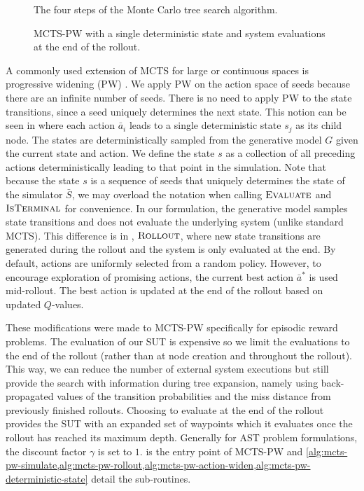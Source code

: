 \begin{figure*}[!t]
\centering
\resizebox{\textwidth}{!}{}
\caption{The four steps of the Monte Carlo tree search algorithm.}
\label{fig:mcts}
\end{figure*}

\begin{figure}[!b]
\centering
\resizebox{0.5\textwidth}{!}{}
\caption{MCTS-PW with a single deterministic state and system evaluations at the end of the rollout.}
\label{fig:mcts_pw}
\end{figure}
A commonly used extension of MCTS for large or continuous spaces is progressive widening (PW) \cite{chaslot2007progressive,mcts_ucb,ll_wildfire,mcts_wildfire}.
We apply PW on the action space of seeds because there are an infinite number of seeds.
There is no need to apply PW to the state transitions, since a seed uniquely determines the next state. 
This notion can be seen in  where each action $\bar{a}_i$ leads to a single deterministic state $s_j$ as its child node.
The states are deterministically sampled from the generative model $G$ given the current state and action.
We define the state $s$ as a collection of all preceding actions deterministically leading to that point in the simulation.
Note that because the state $s$ is a sequence of seeds that uniquely determines the state of the simulator $\bar{S}$, we may overload the notation when calling $\textsc{Evaluate}$ and $\textsc{IsTerminal}$ for convenience.
In our formulation, the generative model samples state transitions and does not evaluate the underlying system (unlike standard MCTS).
This difference is in , $\textsc{Rollout}$, where new state transitions are generated during the rollout and the system is only evaluated at the end.
By default, actions are uniformly selected from a random policy.
However, to encourage exploration of promising actions, the current best action $\bar{a}^*$ is used mid-rollout.
The best action is updated at the end of the rollout based on updated $Q$-values.


These modifications were made to MCTS-PW specifically for episodic reward problems.
The evaluation of our SUT is expensive so we limit the evaluations to the end of the rollout (rather than at node creation and throughout the rollout).
This way, we can reduce the number of external system executions but still provide the search with information during tree expansion, namely using back-propagated values of the transition probabilities and the miss distance from previously finished rollouts.
Choosing to evaluate at the end of the rollout provides the SUT with an expanded set of waypoints which it evaluates once the rollout has reached its maximum depth.
Generally for AST problem formulations, the discount factor $\gamma$ is set to $1$.
 is the entry point of MCTS-PW and \cref{alg:mcts-pw-simulate,alg:mcts-pw-rollout,alg:mcts-pw-action-widen,alg:mcts-pw-deterministic-state} detail the sub-routines.


